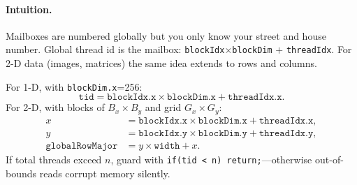 \paragraph{Intuition.} Mailboxes are numbered globally but you only know your street and house number. Global thread id is the mailbox: \texttt{blockIdx}$\times$\texttt{blockDim} $+$ \texttt{threadIdx}. For 2-D data (images, matrices) the same idea extends to rows and columns.

For 1-D, with \texttt{blockDim.x}=256:
\begin{equation}
\texttt{tid} = \texttt{blockIdx.x}\times\texttt{blockDim.x} + \texttt{threadIdx.x}.
\end{equation}
For 2-D, with blocks of $B_x\times B_y$ and grid $G_x\times G_y$:
\begin{align}
x &= \texttt{blockIdx.x}\times\texttt{blockDim.x} + \texttt{threadIdx.x},\\
y &= \texttt{blockIdx.y}\times\texttt{blockDim.y} + \texttt{threadIdx.y},\\
\texttt{globalRowMajor} &= y\times\texttt{width} + x.
\end{align}
If total threads exceed $n$, guard with \texttt{if(tid < n) return;}---otherwise out-of-bounds reads corrupt memory silently.

